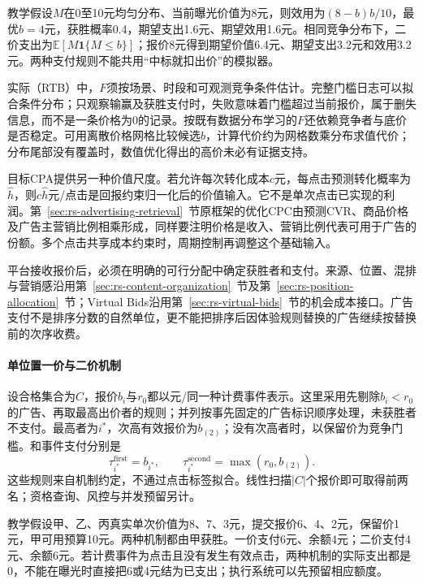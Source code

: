 教学假设$M$在0至10元均匀分布、当前曝光价值为8元，则效用为$(8-b)b/10$，最优$b=4$元，获胜概率0.4，期望支出1.6元、期望效用1.6元。相同竞争分布下，二价支出为$\mathbb{E}[M\mathbf{1}\{M\leq b\}]$；报价8元得到期望价值6.4元、期望支出3.2元和效用3.2元。两种支付规则不能共用“中标就扣出价”的模拟器。

实际（RTB）中，$F$须按场景、时段和可观测竞争条件估计。完整门槛日志可以拟合条件分布；只观察输赢及获胜支付时，失败意味着门槛超过当前报价，属于删失信息，而不是一条价格为0的记录。按既有数据分布学习的$F$还依赖竞争者与底价是否稳定。可用离散价格网格比较候选$b$，计算代价约为网格数乘分布求值代价；分布尾部没有覆盖时，数值优化得出的高价未必有证据支持。

目标CPA提供另一种价值尺度。若允许每次转化成本$c$元，每点击预测转化概率为$\widehat h$，则$c\widehat h$元/点击是回报约束归一化后的价值输入。它不是单次点击已实现的利润。第~\ref{sec:rs-advertising-retrieval}~节原框架的优化CPC由预测CVR、商品价格及广告主营销比例相乘形成，同样要注明价格是收入、营销比例代表可用于广告的份额。多个点击共享成本约束时，周期控制再调整这个基础输入。

平台接收报价后，必须在明确的可行分配中确定获胜者和支付。来源、位置、混排与营销感沿用第~\ref{sec:rs-content-organization}~节及第~\ref{sec:rs-position-allocation}~节；Virtual Bids沿用第~\ref{sec:rs-virtual-bids}~节的机会成本接口。广告支付不是排序分数的自然单位，更不能把排序后因体验规则替换的广告继续按替换前的次序收费。

\paragraph{单位置一价与二价机制}
\label{sec:rs-advertising-single-auction}

设合格集合为$C$，报价$b_i$与$r_0$都以元/同一种计费事件表示。这里采用先剔除$b_i<r_0$的广告、再取最高出价者的规则；并列按事先固定的广告标识顺序处理，未获胜者不支付。最高者为$i^*$，次高有效报价为$b_{(2)}$；没有次高者时，以保留价为竞争门槛。和事件支付分别是
\begin{equation}
  \tau_{i^*}^{\mathrm{first}}=b_{i^*},\qquad
  \tau_{i^*}^{\mathrm{second}}=\max(r_0,b_{(2)}).
  \label{eq:rs-advertising-single-auction}
\end{equation}
这些规则来自机制约定，不通过点击标签拟合。线性扫描$|C|$个报价即可取得前两名；资格查询、风控与并发预留另计。

教学假设甲、乙、丙真实单次价值为8、7、3元，提交报价6、4、2元，保留价1元，甲可用预算10元。两种机制都由甲获胜。一价支付6元、余额4元；二价支付4元、余额6元。若计费事件为点击且没有发生有效点击，两种机制的实际支出都是0，不能在曝光时直接把6或4元结为已支出；执行系统可以先预留相应额度。

